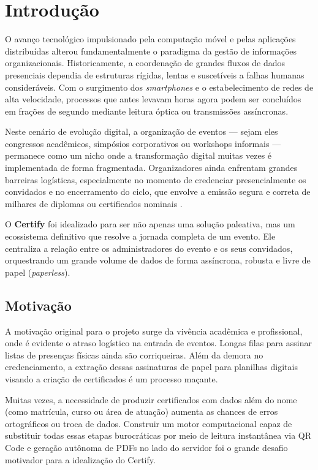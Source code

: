 \chapter{Introdução}

O avanço tecnológico impulsionado pela computação móvel e pelas aplicações distribuídas alterou fundamentalmente o paradigma da gestão de informações organizacionais. Historicamente, a coordenação de grandes fluxos de dados presenciais dependia de estruturas rígidas, lentas e suscetíveis a falhas humanas consideráveis. Com o surgimento dos \textit{smartphones} e o estabelecimento de redes de alta velocidade, processos que antes levavam horas agora podem ser concluídos em frações de segundo mediante leitura óptica ou transmissões assíncronas.

Neste cenário de evolução digital, a organização de eventos --- sejam eles congressos acadêmicos, simpósios corporativos ou workshops informais --- permanece como um nicho onde a transformação digital muitas vezes é implementada de forma fragmentada. Organizadores ainda enfrentam grandes barreiras logísticas, especialmente no momento de credenciar presencialmente os convidados e no encerramento do ciclo, que envolve a emissão segura e correta de milhares de diplomas ou certificados nominais \cite{dotnet}.

O \textbf{Certify} foi idealizado para ser não apenas uma solução paleativa, mas um ecossistema definitivo que resolve a jornada completa de um evento. Ele centraliza a relação entre os administradores do evento e os seus convidados, orquestrando um grande volume de dados de forma assíncrona, robusta e livre de papel (\textit{paperless}).

\section{Motivação}

A motivação original para o projeto surge da vivência acadêmica e profissional, onde é evidente o atraso logístico na entrada de eventos. Longas filas para assinar listas de presenças físicas ainda são corriqueiras. Além da demora no credenciamento, a extração dessas assinaturas de papel para planilhas digitais visando a criação de certificados é um processo maçante. 

Muitas vezes, a necessidade de produzir certificados com dados além do nome (como matrícula, curso ou área de atuação) aumenta as chances de erros ortográficos ou troca de dados. Construir um motor computacional capaz de substituir todas essas etapas burocráticas por meio de leitura instantânea via QR Code e geração autônoma de PDFs no lado do servidor foi o grande desafio motivador para a idealização do Certify.


